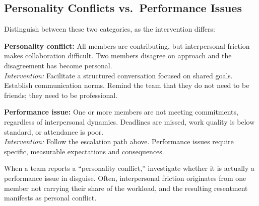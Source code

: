 \subsection{Personality Conflicts vs.\ Performance Issues}

Distinguish between these two categories, as the intervention differs:

\begin{faqbox}
\textbf{Personality conflict:} All members are contributing, but interpersonal friction makes collaboration difficult. Two members disagree on approach and the disagreement has become personal.\\
\textit{Intervention:} Facilitate a structured conversation focused on shared goals. Establish communication norms. Remind the team that they do not need to be friends; they need to be professional.

\textbf{Performance issue:} One or more members are not meeting commitments, regardless of interpersonal dynamics. Deadlines are missed, work quality is below standard, or attendance is poor.\\
\textit{Intervention:} Follow the escalation path above. Performance issues require specific, measurable expectations and consequences.
\end{faqbox}

\begin{tipbox}
When a team reports a ``personality conflict,'' investigate whether it is actually a performance issue in disguise. Often, interpersonal friction originates from one member not carrying their share of the workload, and the resulting resentment manifests as personal conflict.
\end{tipbox}


